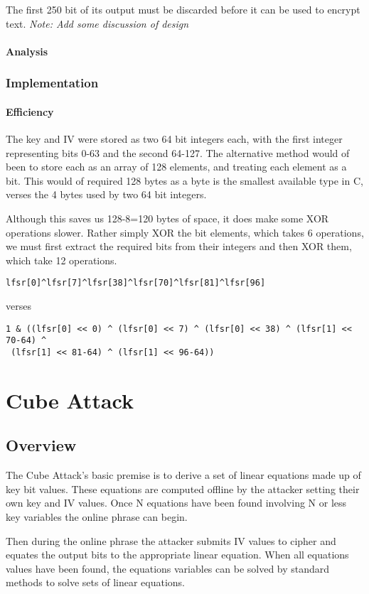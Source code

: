 \documentclass{report}
\begin{document}
The first 250 bit of its output must be discarded before it can be used to encrypt text.
\textit{Note: Add some discussion of design}
\subsubsection{Analysis}


\subsection{Implementation}
\subsubsection{Efficiency}
The key and IV were stored as two 64 bit integers each, with the first integer representing bits 0-63 and the second 64-127. The alternative method would of been to store each as an array of 128 elements, and treating each element as a bit. This would of required 128 bytes as a byte is the smallest available type in C, verses the 4 bytes used by two 64 bit integers.

Although this saves us 128-8=120 bytes of space, it does make some XOR operations slower. Rather simply XOR the bit elements, which takes 6 operations, we must first extract the required bits from their integers and then XOR them, which take 12 operations.
\begin{verbatim}
lfsr[0]^lfsr[7]^lfsr[38]^lfsr[70]^lfsr[81]^lfsr[96]
\end{verbatim}
verses
\begin{verbatim}
1 & ((lfsr[0] << 0) ^ (lfsr[0] << 7) ^ (lfsr[0] << 38) ^ (lfsr[1] << 70-64) ^
 (lfsr[1] << 81-64) ^ (lfsr[1] << 96-64))
\end{verbatim}
\chapter{Cube Attack}
\section{Overview}
The Cube Attack's basic premise is to derive a set of linear equations made up of key bit values. These equations are computed offline by the attacker setting their own key and IV values. Once N equations have been found involving N or less key variables the online phrase can begin.

Then during the online phrase the attacker submits IV values to cipher and equates the output bits to the appropriate linear equation. When all equations values have been found, the equations variables can be solved by standard methods to solve sets of linear equations.
\end{document}

